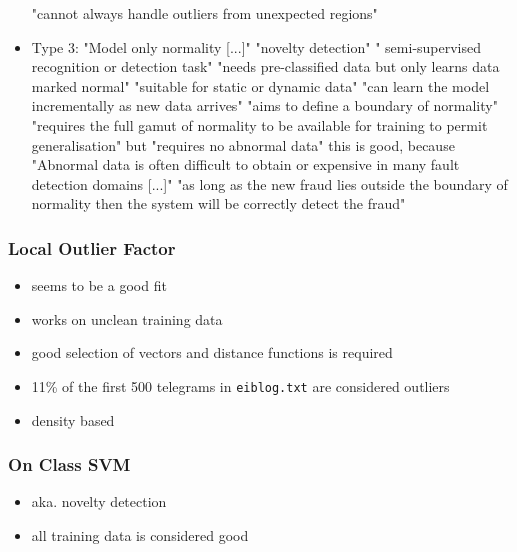 \begin{itemize}
				\subitem "cannot always handle outliers from unexpected regions" \parencite{Hodge2004}
			\item Type 3: "Model only normality [...]" \parencite{Hodge2004}
				\subitem "novelty detection" \parencite{Hodge2004} " semi-supervised recognition or detection task" \parencite{Hodge2004}
				\subitem "needs pre-classified data but only learns data marked normal" \parencite{Hodge2004}
				\subitem "suitable for static or dynamic data" \parencite{Hodge2004}
				\subitem "can learn the model incrementally as new data arrives" \parencite{Hodge2004}
				\subitem "aims to define a boundary of normality" \parencite{Hodge2004}
				\subitem "requires the full gamut of normality to be available for training to permit generalisation" \parencite{Hodge2004} but "requires no abnormal data" \parencite{Hodge2004}
				\subitem this is good, because "Abnormal data is often difficult to obtain or expensive in many fault detection domains [...]" \parencite{Hodge2004}
				\subitem "as long as the new fraud lies outside the boundary of normality then the system will be correctly detect the fraud" \parencite{Hodge2004}
				
		\end{itemize}
	
	\subsubsection{Local Outlier Factor}
		\begin{itemize}
			\item seems to be a good fit
			\item works on unclean training data
			\item good selection of vectors and distance functions is required
			\item 11\% of the first 500 telegrams in \verb|eiblog.txt| are considered outliers
			\item density based
		\end{itemize}
	
	\subsubsection{On Class SVM}
		\begin{itemize}
			\item aka. novelty detection
			\item all training data is considered good
		\end{itemize}
	
